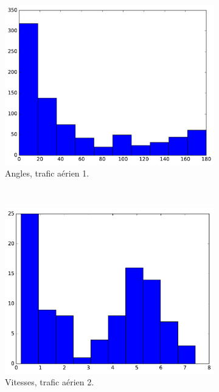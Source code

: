 \begin{appendices}
\begin{figure}[htbp]
\begin{subfigure}[t]{\subImgWclicks}
			\centering
			\includegraphics[width=\textwidth]{figures/ch3/mhA_angle}
			\caption{Angles, trafic aérien 1.}
			\label{fig:mhA_angle}
		\end{subfigure}
		~
		\begin{subfigure}[t]{\subImgWclicks}
			\centering
			\includegraphics[width=\textwidth]{figures/ch3/germanwingsA_filteredSpeed}
			\caption{Vitesses, trafic aérien 2.}
			\label{fig:germanwingsA_filteredSpeed}
		\end{subfigure}
		~
		\begin{subfigure}[t]{\subImgWclicks}
			\centering

\end{subfigure}
\end{figure}
\end{appendices}

